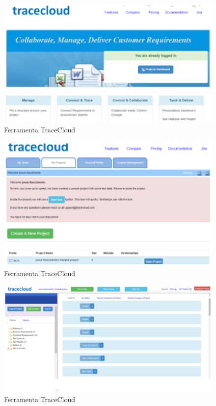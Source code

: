 	 \begin{figure}[!h]
	 	\centering
	 	\includegraphics[keepaspectratio=true,scale=0.75]{figuras/tracecloud1.eps}
	 	\caption{Ferramenta TraceCloud}
	 	\label{fig07}
	 \end{figure}

	 \begin{figure}[!h]
	   \centering
	   \includegraphics[keepaspectratio=true,scale=0.8]{figuras/tracecloud2.eps}
	   \caption{Ferramenta TraceCloud}
	   \label{fig08}
	 \end{figure}

	 \begin{figure}[!h]
	   \centering
	   \includegraphics[keepaspectratio=true,scale=0.7]{figuras/tracecloud3.eps}
	   \caption{Ferramenta TraceCloud}
	   \label{fig09}
	 \end{figure}

